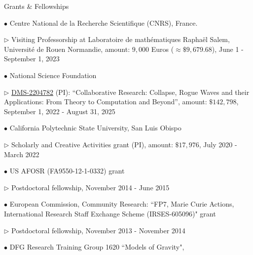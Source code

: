 \documentclass[10pt]{article} %
\newenvironment{outerlist}[1][\enskip\textbullet]%
        {\begin{itemize}[#1]}{\end{itemize}%
         \vspace{-.6\baselineskip}}
\newenvironment{innerlist}[1][\enskip\textbullet]%
        {\begin{compactitem}[#1]}{\end{compactitem}}
\begin{document}
\begin{section}{Grants \& Fellowships}
\begin{outerlist}
\item[$\bullet$]
\vskip -7mm Centre National de la Recherche Scientifique (CNRS), France. 
\begin{innerlist}
\item[$\triangleright$] Visiting Professorship at Laboratoire de math\'ematiques 
Rapha\"el Salem, Universit\'e de Rouen Normandie, amount: $9,000$ Euros ($\approx \$ 9,679.68$),
June 1 - September 1, 2023
\end{innerlist}
\item[$\bullet$]
National Science Foundation
\begin{innerlist}
\item[$\triangleright$] \href{https://www.nsf.gov/awardsearch/showAward?AWD_ID=2204782&HistoricalAwards=false}{DMS-2204782} (PI): %
``Collaborative Research: Collapse, Rogue Waves and their Applications: From Theory to Computation and Beyond'', %
amount: $\$142,798$, September 1, 2022 - August 31, 2025 
\end{innerlist}
\item[$\bullet$]
California Polytechnic State University, San Luis Obispo
\begin{innerlist} 
\item[$\triangleright$] Scholarly and Creative Activities 
grant (PI), amount: $\$17,976$, July 2020 - March 2022
\end{innerlist}
\item[$\bullet$]
US AFOSR (FA9550-12-1-0332) grant
\begin{innerlist}
\item[$\triangleright$] Postdoctoral fellowship, November 2014 - June 2015
\end{innerlist}
\item[$\bullet$] European Commission, Community Research: ``FP7, Marie Curie 
Actions, International Research Staff Exchange Scheme (IRSES-605096)" grant
\begin{innerlist}
\item[$\triangleright$] Postdoctoral fellowship, November 2013 - November 2014
\end{innerlist}
\item[$\bullet$] DFG Research Training Group 1620 ``Models of Gravity", 

\end{outerlist}
\end{section}
\end{document}
